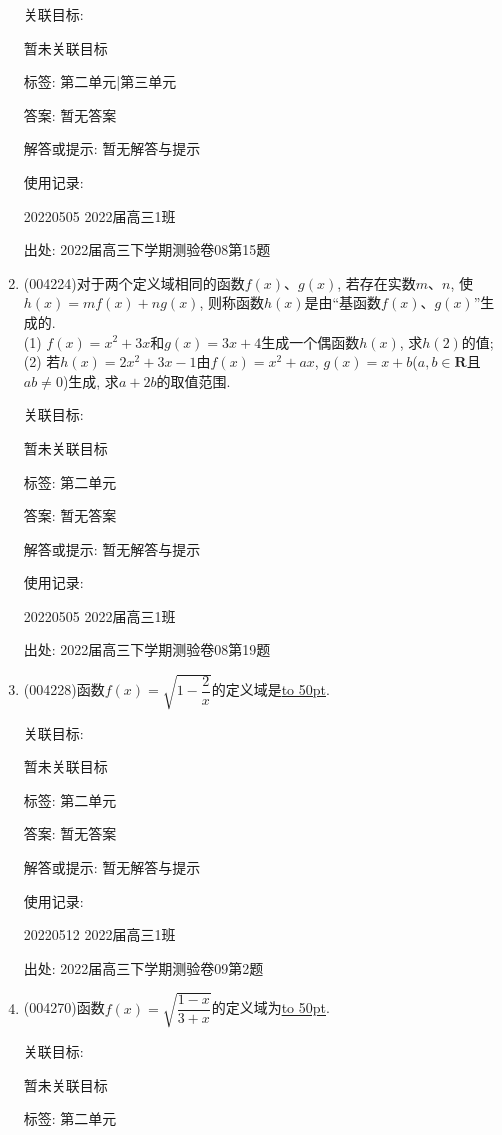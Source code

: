\documentclass[10pt,a4paper]{article}
\newcommand{\blank}[1]{\underline{\hbox to #1pt{}}}
\begin{document}
\begin{enumerate}[1.]
关联目标:

暂未关联目标



标签: 第二单元|第三单元

答案: 暂无答案

解答或提示: 暂无解答与提示

使用记录:

20220505	2022届高三1班	


出处: 2022届高三下学期测验卷08第15题
\item { (004224)}对于两个定义域相同的函数$f(x)$、$g(x)$, 若存在实数$m$、$n$, 使$h(x)=mf(x)+ng(x)$, 则称函数$h(x)$是由``基函数$f(x)$、$g(x)$''生成的.\\
(1) $f(x)=x^2+3x$和$g(x)=3x+4$生成一个偶函数$h(x)$, 求$h(2)$的值;\\
(2) 若$h(x)=2x^2+3x-1$由$f(x)=x^2+ax$, $g(x)=x+b$($a,b\in \mathbf{R}$且$ab\ne 0$)生成, 求$a+2b$的取值范围.


关联目标:

暂未关联目标



标签: 第二单元

答案: 暂无答案

解答或提示: 暂无解答与提示

使用记录:

20220505	2022届高三1班		


出处: 2022届高三下学期测验卷08第19题
\item { (004228)}函数$f(x)=\sqrt{1-\dfrac 2x}$的定义域是\blank{50}.


关联目标:

暂未关联目标



标签: 第二单元

答案: 暂无答案

解答或提示: 暂无解答与提示

使用记录:

20220512	2022届高三1班	


出处: 2022届高三下学期测验卷09第2题
\item { (004270)}函数$f(x)=\sqrt{\dfrac{1-x}{3+x}}$的定义域为\blank{50}.


关联目标:

暂未关联目标



标签: 第二单元


\end{enumerate}
\end{document}
